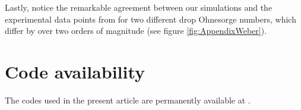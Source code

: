 \documentclass{jfm}
\newcommand{\Ohn}{\mathit{Oh}}
\newcommand{\Wen}{\mathit{We}}
\newcommand{\Bon}{\mathit{Bo}}
\begin{document}
Lastly, notice the remarkable agreement between our simulations and the experimental data points from \citet{jha2020viscous} for two different drop Ohnesorge numbers, which differ by over two orders of magnitude (see figure \ref{fig:AppendixWeber}).


\section{Code availability}
The codes used in the present article are permanently available at \citet{basiliskVatsalViscousBouncing}.




\end{document}
